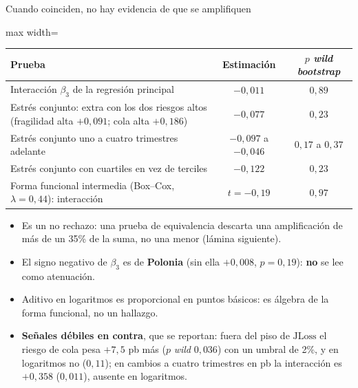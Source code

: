 \documentclass[aspectratio=169]{beamer}
\newcommand{\JLoss}{\mathrm{JLoss}}
\begin{document}
\begin{frame}{Cuando coinciden, no hay evidencia de que se amplifiquen}
\centering
\footnotesize
\begin{adjustbox}{max width=\textwidth}
\begin{tabular}{l cc}
\toprule
Prueba & Estimación & $p$ \textit{wild bootstrap} \\
\midrule
Interacción $\beta_3$ de la regresión principal & $-0{,}011$ & $0{,}89$ \\
Estrés conjunto: extra con los dos riesgos altos (fragilidad alta $+0{,}091$; cola alta $+0{,}186$) & $-0{,}077$ & $0{,}23$ \\
Estrés conjunto uno a cuatro trimestres adelante & $-0{,}097$ a $-0{,}046$ & $0{,}17$ a $0{,}37$ \\
Estrés conjunto con cuartiles en vez de terciles & $-0{,}122$ & $0{,}23$ \\
Forma funcional intermedia (Box--Cox, $\lambda=0{,}44$): interacción & $t=-0{,}19$ & $0{,}97$ \\
\bottomrule
\end{tabular}
\end{adjustbox}
\vspace{3pt}
\begin{itemize}\footnotesize\setlength\itemsep{2pt}
\item Es un no rechazo: una prueba de equivalencia descarta una amplificación de más de un 35\% de la suma, no una menor (lámina siguiente).
\item El signo negativo de $\beta_3$ es de \textbf{Polonia} (sin ella $+0{,}008$, $p=0{,}19$): \textbf{no} se lee como atenuación.
\item Aditivo en logaritmos es proporcional en puntos básicos: es álgebra de la forma funcional, no un hallazgo.
\item \textbf{Señales débiles en contra}, que se reportan: fuera del piso de $\JLoss$ el riesgo de cola pesa $+7{,}5$ pb más ($p$ \textit{wild} $0{,}036$) con un umbral de 2\%, y en logaritmos no ($0{,}11$); en cambios a cuatro trimestres en pb la interacción es $+0{,}358$ ($0{,}011$), ausente en logaritmos.
\end{itemize}
\end{frame}
\end{document}
